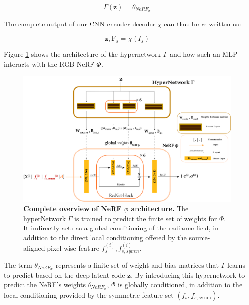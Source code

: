 \begin{equation}
  \Gamma(\mathbf{z}) = \theta_{NeRF_{\Phi}} 
\end{equation}

The complete output of our CNN encoder-decoder $\chi$ can thus be re-written as:

\begin{equation}
    \textbf{z}, \textbf{F}_{s} = \chi(I_{s})
\end{equation}

Figure \ref{fig:supp_hyper_nerf} shows the architecture of the hypernetwork $\Gamma$ and how such an MLP interacts with the RGB NeRF $\Phi$.

\begin{figure}[htp!]
  \begin{center}
\includegraphics[width=\linewidth]{images/epinerf/supp_hyper_nerf.png}
\caption{\textbf{Complete overview of NeRF $\phi$ architecture.} The hyperNetwork $\Gamma$ is trained to predict the finite set of weights for $\Phi$. It indirectly acts as a global conditioning of the radiance field, in addition to the direct local conditioning offered by the source-aligned pixel-wise feature $f_{s}^{(i)},f_{s,symm}^{(i)}$.}
\label{fig:supp_hyper_nerf}
\end{center}
\end{figure} 

The term $\theta_{NeRF_{\Phi}}$ represents a finite set of weight and bias matrices that $\Gamma$ learns to predict based on the deep latent code $\mathbf{z}$. By introducing this hypernetwork to predict the NeRF's weights $\theta_{NeRF_{\Phi}}$, $\Phi$ is globally conditioned, in addition to the local conditioning provided by the symmetric feature set $(f_{s}, f_{s, \text{symm}})$.  \newline

